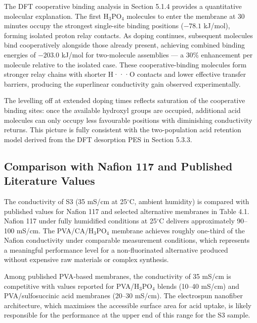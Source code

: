 \documentclass[12pt,a4paper]{report}
\begin{document}
The DFT cooperative binding analysis in Section 5.1.4 provides a quantitative molecular explanation. The first H\(_3\)PO\(_4\) molecules to enter the membrane at 30 minutes occupy the strongest single-site binding positions (\(-78.1\) kJ/mol), forming isolated proton relay contacts. As doping continues, subsequent molecules bind cooperatively alongside those already present, achieving combined binding energies of \(-203.0\) kJ/mol for two-molecule assemblies — a 30\% enhancement per molecule relative to the isolated case. These cooperative-binding molecules form stronger relay chains with shorter H···O contacts and lower effective transfer barriers, producing the superlinear conductivity gain observed experimentally.\cite{21,55}

The levelling off at extended doping times reflects saturation of the cooperative binding sites: once the available hydroxyl groups are occupied, additional acid molecules can only occupy less favourable positions with diminishing conductivity returns. This picture is fully consistent with the two-population acid retention model derived from the DFT desorption PES in Section 5.3.3.

\subsection{Comparison with Nafion 117 and Published Literature Values}
The conductivity of S3 (35 mS/cm at 25\(^\circ\)C, ambient humidity) is compared with published values for Nafion 117 and selected alternative membranes in Table 4.1. Nafion 117 under fully humidified conditions at 25\(^\circ\)C delivers approximately 90–100 mS/cm.\cite{5,6} The PVA/CA/H\(_3\)PO\(_4\) membrane achieves roughly one-third of the Nafion conductivity under comparable measurement conditions, which represents a meaningful performance level for a non-fluorinated alternative produced without expensive raw materials or complex synthesis.

Among published PVA-based membranes, the conductivity of 35 mS/cm is competitive with values reported for PVA/H\(_3\)PO\(_4\) blends (10–40 mS/cm) and PVA/sulfosuccinic acid membranes (20–30 mS/cm).\cite{21,57,58} The electrospun nanofiber architecture, which maximises the accessible surface area for acid uptake, is likely responsible for the performance at the upper end of this range for the S3 sample.\cite{12,13,14}
\end{document}
